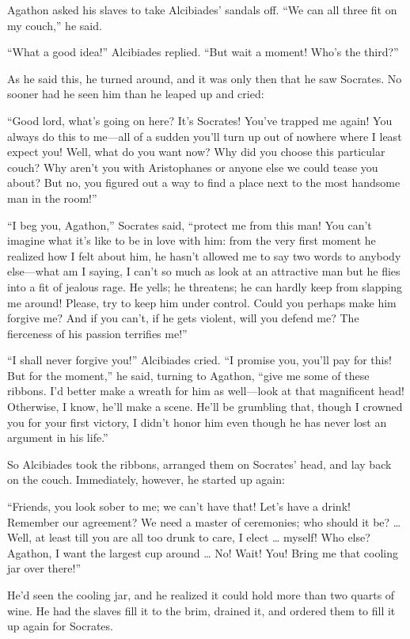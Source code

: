 Agathon asked his slaves to take Alcibiades’ sandals off. “We can all
three fit on my couch,” he said.

“What a good idea!” Alcibiades replied. “But wait a moment! Who’s the
third?”

As he said this, he turned around, and it was only then that he saw
Socrates. No sooner had he seen him than he leaped up and cried:

“Good lord, what’s going on here? It’s Socrates! You’ve trapped me
 again! You always do this to me---all of a sudden you’ll turn up
out of nowhere where I least expect you! Well, what do you want now? Why
did you choose this particular couch? Why aren’t you with Aristophanes
or anyone else we could tease you about? But no, you figured out a way
to find a place next to the most handsome man in the room!”

“I beg you, Agathon,” Socrates said, “protect me from this man! You
 can’t imagine what it’s like to be in love with him: from the
very first moment he realized how I felt about him, he hasn’t allowed me
to say two words to anybody else---what am I saying, I can’t so much as
look at an attractive man but he flies into a fit of jealous rage. He
yells; he threatens; he can hardly keep from slapping me around! Please,
try to keep him under control. Could you perhaps make him forgive me?
And if you can’t, if he gets violent, will you defend me? The fierceness
of his passion terrifies me!”

“I shall never forgive you!” Alcibiades cried. “I promise you, you’ll
pay  for this! But for the moment,” he said, turning to Agathon,
“give me some of these ribbons. I’d better make a wreath for him as
well---look at that magnificent head! Otherwise, I know, he’ll make a
scene. He’ll be grumbling that, though I crowned you for your first
victory, I didn’t honor him even though he has never lost an argument in
his life.”

So Alcibiades took the ribbons, arranged them on Socrates’ head, and lay
back on the couch. Immediately, however, he started up again:

“Friends, you look sober to me; we can’t have that! Let’s have a drink!
Remember our agreement? We need a master of ceremonies; who should it
be? \ldots{} Well, at least till you are all too drunk to care, I elect
\ldots{} myself! Who else? Agathon, I want the largest cup around
\ldots{} No! Wait! You!  Bring me that cooling jar over
there!”

He’d seen the cooling jar, and he realized it could hold more than two
quarts of wine. He had the slaves fill it to the brim, drained it, and
ordered them to fill it up again for Socrates.

